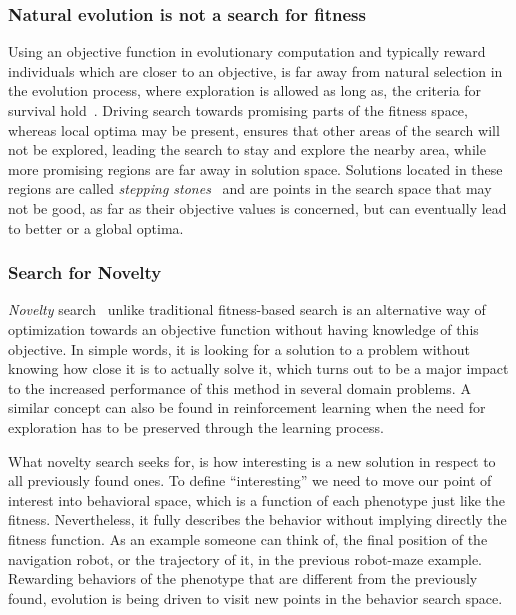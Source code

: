 \subsubsection*{Natural evolution is not a search for fitness}

Using an objective function in evolutionary computation and typically reward individuals which are closer to an objective, is far away from natural selection in the evolution process, where exploration is allowed as long as, the criteria for survival hold~\cite{lehman2010revising}. Driving search towards promising parts of the fitness space, whereas local optima may be present, ensures that other areas of the search will not be explored, leading the search to stay and explore the nearby area, while more promising regions are far away in solution space. Solutions located in these regions are called \emph{stepping stones}~\cite{lehman2008exploiting,lehman2011abandoning,lehman2010revising,risi2009novelty} and are points in the search space that may not be good, as far as their objective values is concerned, but can eventually lead to better or a global optima.


\subsubsection*{Search for Novelty}

\emph{Novelty} search~\cite{lehman2008exploiting,lehman2011abandoning,lehman2010revising, risi2009novelty} unlike traditional fitness-based search is an alternative way of optimization towards an objective function without having knowledge of this objective. In simple words, it is looking for a solution to a problem without knowing how close it is to actually solve it, which turns out to be a major impact to the increased performance of this method in several domain problems. A similar concept can also be found in reinforcement learning when the need for exploration has to be preserved through the learning process.

What novelty search seeks for, is how interesting is a new solution in respect to all previously found ones. To define ``interesting'' we need to move our point of interest into behavioral space, which is a function of each phenotype just like the fitness. Nevertheless, it fully describes the behavior without implying directly the fitness function. As an example someone can think of, the final position of the navigation robot, or the trajectory of it, in the previous robot-maze example. Rewarding behaviors of the phenotype that are different from the previously found, evolution is being driven to visit new points in the behavior search space.


